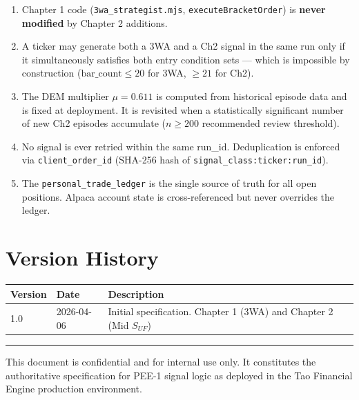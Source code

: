\documentclass[11pt, a4paper]{article}
\begin{document}
\begin{enumerate}
  \item Chapter 1 code (\texttt{3wa\_strategist.mjs}, \texttt{executeBracketOrder}) is
        \textbf{never modified} by Chapter 2 additions.

  \item A ticker may generate both a 3WA and a Ch2 signal in the same run only if it
        simultaneously satisfies both entry condition sets — which is impossible by
        construction ($\text{bar\_count} \leq 20$ for 3WA, $\geq 21$ for Ch2).

  \item The DEM multiplier $\mu = 0.611$ is computed from historical episode data and
        is fixed at deployment. It is revisited when a statistically significant number
        of new Ch2 episodes accumulate ($n \geq 200$ recommended review threshold).

  \item No signal is ever retried within the same run\_id. Deduplication is enforced
        via \texttt{client\_order\_id} (SHA-256 hash of \texttt{signal\_class:ticker:run\_id}).

  \item The \texttt{personal\_trade\_ledger} is the single source of truth for all
        open positions. Alpaca account state is cross-referenced but never overrides
        the ledger.
\end{enumerate}

\section{Version History}

\begin{center}
\begin{tabular}{@{}lll@{}}
\toprule
\textbf{Version} & \textbf{Date} & \textbf{Description} \\
\midrule
1.0 & 2026-04-06 & Initial specification. Chapter 1 (3WA) and Chapter 2 (Mid $S_{UF}$) \\
\bottomrule
\end{tabular}
\end{center}

\vspace{2em}
\hrule
\vspace{0.5em}
{\color{tfe-gray}\small This document is confidential and for internal use only.
It constitutes the authoritative specification for PEE-1 signal logic as deployed
in the Tao Financial Engine production environment.}
\end{document}
